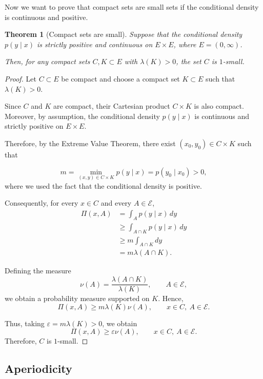 \documentclass{article}
\newtheorem{theorem}[theorem]{Theorem}
\begin{document}
Now we want to prove that compact sets are small sets if the conditional density is continuous and positive.

\begin{theorem}[Compact sets are small]
  \label{thm:compact-small}
  Suppose that the conditional density $p(y \mid x)$ is strictly positive and continuous on $E \times E$, where $E=(0,\infty)$.

  Then, for any compact sets $C,K \subset E$ with $\lambda(K)>0$, the set $C$ is $1$-small.
\end{theorem}

\begin{proof}
  Let $C \subset E$ be compact and choose a compact set $K \subset E$ such that $\lambda(K)>0$.

  Since $C$ and $K$ are compact, their Cartesian product $C \times K$ is also compact. Moreover, by assumption, the conditional density $p(y \mid x)$ is continuous and strictly positive on $E \times E$.

  Therefore, by the Extreme Value Theorem, there exist $(x_0, y_0) \in C \times K$ such that

  \[
    m
    =
    \min_{(x,y)\in C\times K} p(y \mid x) = p(y_0 \mid x_0) > 0,
  \]
  where we used the fact that the conditional density is positive.

  Consequently, for every $x\in C$ and every $A\in\mathcal{E}$,
  \[
    \begin{aligned}
      \Pi(x,A)
       & = \int_A p(y \mid x)\,dy           \\
       & \geq \int_{A\cap K}p(y \mid x)\,dy \\
       & \geq m \int_{A\cap K}dy            \\
       & = m \lambda(A\cap K).
    \end{aligned}
  \]

  Defining the measure
  \[
    \nu(A)=\frac{\lambda(A\cap K)}{\lambda(K)},
    \qquad A\in\mathcal{E},
  \]
  we obtain a probability measure supported on $K$. Hence,
  \[
    \Pi(x,A)
    \geq m \lambda(K)\nu(A),
    \qquad x\in C,\ A\in\mathcal{E}.
  \]

  Thus, taking $\varepsilon = m \lambda(K)>0$, we obtain
  \[
    \Pi(x,A) \geq \varepsilon \nu(A),
    \qquad x \in C,\ A \in \mathcal{E}.
  \]
  Therefore, $C$ is $1$-small.
\end{proof}

\subsection{Aperiodicity}
\end{document}
